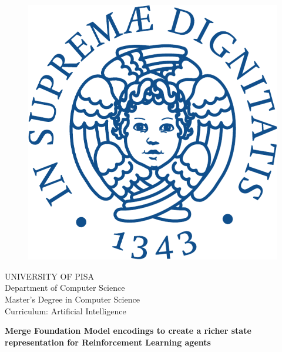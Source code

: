 \begin{titlepage}
\begin{figure}[!htb]
    \centering
    \includegraphics[keepaspectratio=true,scale=0.5]{images/Frontespizio/cherubinFrontespizio-eps-converted-to}
\end{figure}

\begin{center}
    \LARGE{UNIVERSITY OF PISA}
    \vspace{5mm}
    \\ \large{Department of Computer Science}
    \vspace{5mm}
    \\ \LARGE{Master's Degree in Computer Science}
    \\ \LARGE{Curriculum: Artificial Intelligence}
\end{center}

\vspace{7mm}
\begin{center}
    {\LARGE{\bf Merge Foundation Model encodings to create a richer state representation for Reinforcement Learning agents\\ \vspace{5mm}
    }}
    
    

\end{center}
\end{titlepage}
